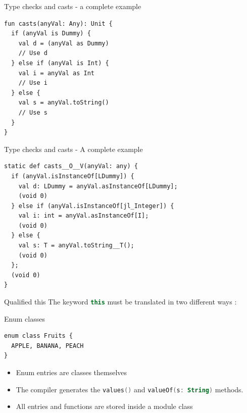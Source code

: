 \documentclass[10pt,usenames,dvipsnames]{beamer}
\newcommand{\inlinecode}[2]{\colorbox{minted-bg}{\lstinline[language=#1]$#2$}}
\newcommand{\scalainline}[1]{\inlinecode{scala}{#1}}
\newcommand{\ktinline}[1]{\inlinecode{kotlin}{#1}}
\begin{document}
\begin{frame}[fragile]{Type checks and casts - a complete example}
 \begin{verbatim}
fun casts(anyVal: Any): Unit {
  if (anyVal is Dummy) {
    val d = (anyVal as Dummy)
    // Use d
  } else if (anyVal is Int) {
    val i = anyVal as Int
    // Use i
  } else {
    val s = anyVal.toString()
    // Use s
  }
}
 \end{verbatim}
\end{frame}

\begin{frame}[fragile]{Type checks and casts - A complete example}
 \begin{verbatim}
static def casts__O__V(anyVal: any) {
  if (anyVal.isInstanceOf[LDummy]) {
    val d: LDummy = anyVal.asInstanceOf[LDummy];
    (void 0)
  } else if (anyVal.isInstanceOf[jl_Integer]) {
    val i: int = anyVal.asInstanceOf[I];
    (void 0)
  } else {
    val s: T = anyVal.toString__T();
    (void 0)
  };
  (void 0)
}
 \end{verbatim}
\end{frame}

\begin{frame}{Qualified this}
 The keyword \ktinline{this} must be translated in two different ways :
 

\end{frame}


\begin{frame}[fragile]{Enum classes}
 \begin{verbatim}
enum class Fruits {
  APPLE, BANANA, PEACH
}
 \end{verbatim}
 
 \begin{itemize}
  \item Enum entries are classes themselves
  \item The compiler generates the \ktinline{values()} and \ktinline{valueOf(s: String)} methods.
  \item All entries and functions are stored inside a module class
 \end{itemize}
\end{frame}
\end{document}
